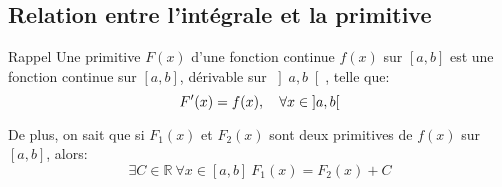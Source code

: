 \documentclass[a4paper]{article}
\begin{document}
\subsection{Relation entre l'intégrale et la primitive}
\begin{parag}{Rappel}
    Une primitive $F\left(x\right)$ d'une fonction continue $f\left(x\right)$ sur $\left[a, b\right]$ est une fonction continue sur $\left[a,b\right]$, dérivable sur $\left]a,b\right[ $, telle que: 
    \[F'\left(x\right) = f\left(x\right), \mathspace \forall x \in \left]a, b\right[ \]
    
    De plus, on sait que si $F_1\left(x\right)$ et $F_2\left(x\right)$ sont deux primitives de $f\left(x\right)$ sur $\left[a, b\right]$, alors: 
    \[\exists C \in \mathbb{R} \ \forall x \in \left[a, b\right] \ F_1\left(x\right) = F_2\left(x\right) + C\]
\end{parag}
\end{document}
